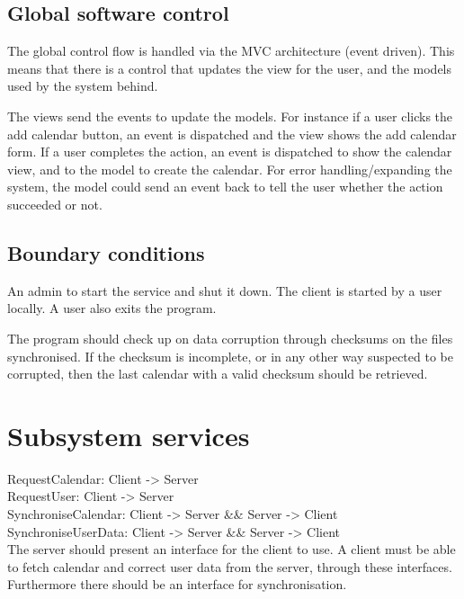 \documentclass[10pt]{report}
\numberwithin{equation}{section} %
\numberwithin{figure}{section} %
\numberwithin{table}{section} %
\begin{document}
\subsection{Global software control}
The global control flow is handled via the MVC architecture (event driven). This
means that there is a control that updates the view for the user, and the models
used by the system behind.

The views send the events to update the models. For instance if a user
clicks the add calendar button, an event is dispatched and the view shows the
add calendar form. If a user completes the action, an event is dispatched to
show the calendar view, and to the model to create the calendar. For error
handling/expanding the system, the model could send an event back to tell the
user whether the action succeeded or not.

\subsection{Boundary conditions}
An admin to start the service and shut it down.
The client is started by a user locally.
A user also exits the program.

The program should check up on data corruption through checksums on the files
synchronised. If the checksum is incomplete, or in any other way suspected to be
corrupted, then the last calendar with a valid checksum should be retrieved.

\section{Subsystem services}
RequestCalendar: Client -> Server\\
RequestUser: Client -> Server\\

SynchroniseCalendar: Client -> Server \&\& Server -> Client\\
SynchroniseUserData: Client -> Server \&\& Server -> Client\\

The server should present an interface for the client to use.  A client must be
able to fetch calendar and correct user data from the server, through these
interfaces. Furthermore there should be an interface for synchronisation.

\end{document}
